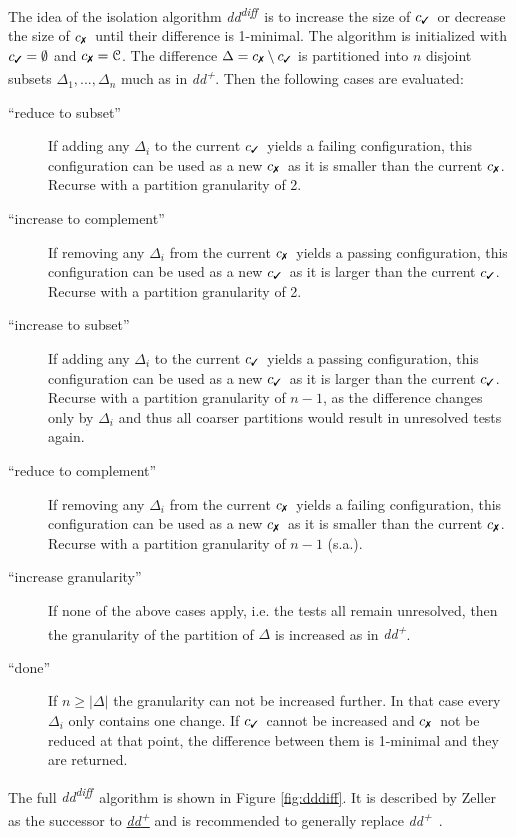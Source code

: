 \documentclass[a4paper,UKenglish]{lipics-v2018}
\newcommand{\ddp}{\textit{dd\textsuperscript{+}}}
\newcommand{\dddiff}{\textit{dd\textsuperscript{diff}}}
\newcommand{\C}[0]{\ensuremath{\mathcal{C}}}
\newcommand{\cmark}{\text{\ding{51}}}
\newcommand{\xmark}{\text{\ding{55}}}
\newcommand{\cpass}{\ensuremath{c_{\cmark}}}
\newcommand{\cfail}{\ensuremath{c_{\xmark}}}
\begin{document}
The idea of the isolation algorithm \dddiff\ is to increase the size of \cpass\ or decrease the size of \cfail\ until their difference is 1-minimal. The algorithm is initialized with $\cpass = \emptyset$ and $\cfail = \C$. The difference $\Delta = \cfail \setminus \cpass$ is partitioned into $n$ disjoint subsets $\Delta_1, ..., \Delta_n$ much as in \ddp. Then the following cases are evaluated:

\begin{description}
  	\item[``reduce to subset''] If adding any $\Delta_i$ to the current \cpass\ yields a failing configuration, this configuration can be used as a new \cfail\ as it is smaller than the current \cfail. Recurse with a partition granularity of 2.
  	\item[``increase to complement''] If removing any $\Delta_i$ from the current \cfail\ yields a passing configuration, this configuration can be used as a new \cpass\ as it is larger than the current \cpass. Recurse with a partition granularity of 2.
  	\item[``increase to subset''] If adding any $\Delta_i$ to the current \cpass\ yields a passing configuration, this configuration can be used as a new \cpass\ as it is larger than the current \cpass. Recurse with a partition granularity of $n-1$, as the difference changes only by $\Delta_i$ and thus all coarser partitions would result in unresolved tests again.
  	\item[``reduce to complement''] If removing any $\Delta_i$ from the current \cfail\ yields a failing configuration, this configuration can be used as a new \cfail\, as it is smaller than the current \cfail. Recurse with a partition granularity of $n-1$ (s.a.).
  	\item[``increase granularity''] If none of the above cases apply, i.e. the tests all remain unresolved, then the granularity of the partition of $\Delta$ is increased as in \ddp. 
  	\item[``done''] If $n \ge |\Delta|$ the granularity can not be increased further. In that case every $\Delta_i$ only contains one change. If \cpass\ cannot be increased and \cfail\ not be reduced at that point, the difference between them is 1-minimal and they are returned.\\
\end{description}
The full \dddiff\ algorithm is shown in Figure \ref{fig:dddiff}. It is described by Zeller as the successor to \hyperref[fig:ddp]{\ddp} and is recommended to generally replace \ddp\ \cite{Zeller:2002:SIF:506201.506206}. \\
\end{document}
